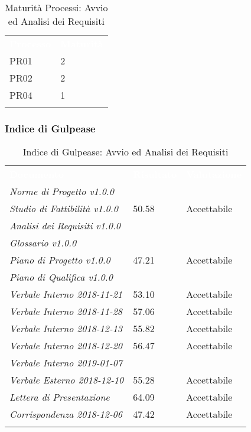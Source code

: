 \begin{longtable}{|C{.47\textwidth}|C{.47\textwidth}|}
\hline
{}\textbf{\textcolor{white}{Processo}} & \textbf{\textcolor{white}{Maturità}}\\
PR01 & 2\\ 
\hline
{}PR02 & 2 \\
\hline
PR04 & 1 \\ 
\hline 
\caption{Maturità Processi: Avvio ed Analisi dei Requisiti}
\label{mat:aar}
\end{longtable}


\subsubsection{Indice di Gulpease}

\begin{longtable}{|C{.47\textwidth}|C{.22\textwidth}|C{.22\textwidth}|}
\hline
{}\textbf{\textcolor{white}{Documento}} & \textbf{\textcolor{white}{Risultato}} & \textbf{\textcolor{white}{Valutazione}}\\
\textit{Norme di Progetto v1.0.0} & & \\
\hline
{}\textit{Studio di Fattibilità v1.0.0} & 50.58 & Accettabile\\
\hline
\textit{Analisi dei Requisiti v1.0.0} & & \\
\hline
{}\textit{Glossario v1.0.0} & & \\
\hline
\textit{Piano di Progetto v1.0.0} & 47.21 & Accettabile \\
\hline
{}\textit{Piano di Qualifica v1.0.0} & & \\

\hline
\textit{Verbale Interno 2018-11-21} & 53.10 & Accettabile\\
\hline
{}\textit{Verbale Interno 2018-11-28} & 57.06 & Accettabile\\
\hline
\textit{Verbale Interno 2018-12-13} & 55.82 & Accettabile\\
\hline
{}\textit{Verbale Interno 2018-12-20} & 56.47 & Accettabile \\
\hline
\textit{Verbale Interno 2019-01-07} & & \\
\hline
{}\textit{Verbale Esterno 2018-12-10} & 55.28 & Accettabile\\
\hline

\textit{Lettera di Presentazione} & 64.09 & Accettabile\\
\hline
{}\textit{Corrispondenza 2018-12-06} & 47.42 & Accettabile\\
\hline

\caption{Indice di Gulpease: Avvio ed Analisi dei Requisiti}
\label{gulp:aar}
\end{longtable}





